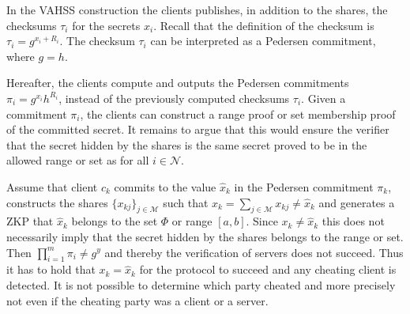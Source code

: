 In the VAHSS construction the clients publishes, in addition to the shares,  the checksums $\tau_i$ for the secrets $x_i$. Recall that the definition of the checksum is  $\tau_i=g^{x_i+R_i}$. The checksum $\tau_i$ can be interpreted as a Pedersen commitment, where $g=h$.

Hereafter, the clients compute and outputs the Pedersen commitments $\pi_i=g^{x_i}h^{R_i}$, instead of the previously computed checksums $\tau_i$.  Given a commitment $\pi_i$, the clients can construct a range proof or set membership proof of the committed secret. It remains to argue that this would ensure the verifier that the secret hidden by the shares is the same secret proved to be in the allowed range or set as for all $i\in\mathcal{N}$.



Assume that client $c_k$ commits to the value $\hat{x}_k$ in the Pedersen commitment $\pi_k$, constructs the shares $\{x_{kj}\}_{j\in\mathcal{M}}$ such that $x_k = \sum_{j\in\mathcal{M}}x_{kj} \neq \hat{x}_k$ and  generates a ZKP that $\hat{x}_k$ belongs to the set $\Phi$ or range $[a,b]$. Since $x_k\neq\hat{x}_k$ this does not necessarily imply that  the secret hidden by the shares belongs to the range or set. Then  $\prod_{i=1}^m \pi_i \neq g^y$  and thereby the verification of servers does not succeed. Thus it has to hold that $x_k= \hat{x}_k$ for the protocol to succeed and any cheating client is detected. It is not possible to determine which party cheated and more precisely not even if the cheating party was a client or a server. 

